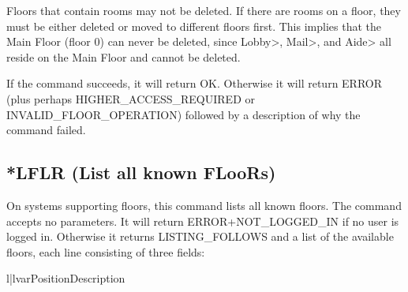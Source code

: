  Floors that contain rooms may not be deleted.  If there are rooms on a floor,
they must be either deleted or moved to different floors first.  This implies
that the Main Floor (floor 0) can never be deleted, since Lobby>, Mail>, and
Aide> all reside on the Main Floor and cannot be deleted.

 If the command succeeds, it will return OK.  Otherwise it will return
ERROR (plus perhaps HIGHER_ACCESS_REQUIRED or INVALID_FLOOR_OPERATION)
followed by a description of why the command failed.



\subsection{*LFLR (List all known FLooRs)}

 On systems supporting floors, this command lists all known floors.  The
command accepts no parameters.  It will return ERROR+NOT_LOGGED_IN if no
user is logged in.  Otherwise it returns LISTING_FOLLOWS and a list of
the available floors, each line consisting of three fields:

\begin{tableii}{l|l}{var}{Position}{Description}




\end{tableii}



